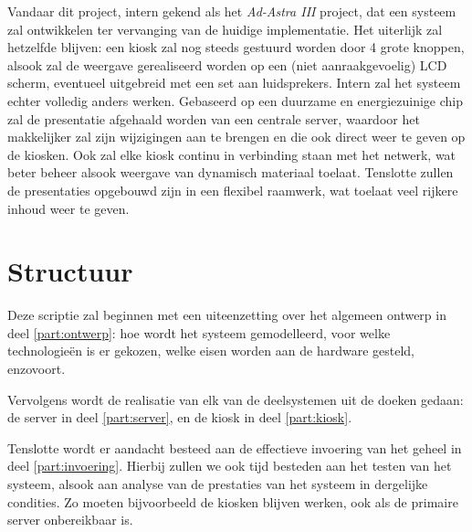 Vandaar dit project, intern gekend als het \emph{Ad-Astra III} project, dat een systeem zal ontwikkelen ter vervanging van de huidige implementatie. Het uiterlijk zal hetzelfde blijven: een kiosk zal nog steeds gestuurd worden door 4 grote knoppen, alsook zal de weergave gerealiseerd worden op een (niet aanraakgevoelig) LCD scherm, eventueel uitgebreid met een set aan luidsprekers.
Intern zal het systeem echter volledig anders werken. Gebaseerd op een duurzame en energiezuinige chip zal de presentatie afgehaald worden van een centrale server, waardoor het makkelijker zal zijn wijzigingen aan te brengen en die ook direct weer te geven op de kiosken. Ook zal elke kiosk continu in verbinding staan met het netwerk, wat beter beheer alsook weergave van dynamisch materiaal toelaat. Tenslotte zullen de presentaties opgebouwd zijn in een flexibel raamwerk, wat toelaat veel rijkere inhoud weer te geven.


%
%

\chapter{Structuur}
\label{chat:structuur}

Deze scriptie zal beginnen met een uiteenzetting over het algemeen ontwerp in deel \ref{part:ontwerp}: hoe wordt het systeem gemodelleerd, voor welke technologieën is er gekozen, welke eisen worden aan de hardware gesteld, enzovoort.

Vervolgens wordt de realisatie van elk van de deelsystemen uit de doeken gedaan: de server in deel \ref{part:server}, en de kiosk in deel \ref{part:kiosk}.

Tenslotte wordt er aandacht besteed aan de effectieve invoering van het geheel in deel \ref{part:invoering}. Hierbij zullen we ook tijd besteden aan het testen van het systeem, alsook aan analyse van de prestaties van het systeem in dergelijke condities. Zo moeten bijvoorbeeld de kiosken blijven werken, ook als de primaire server onbereikbaar is.
